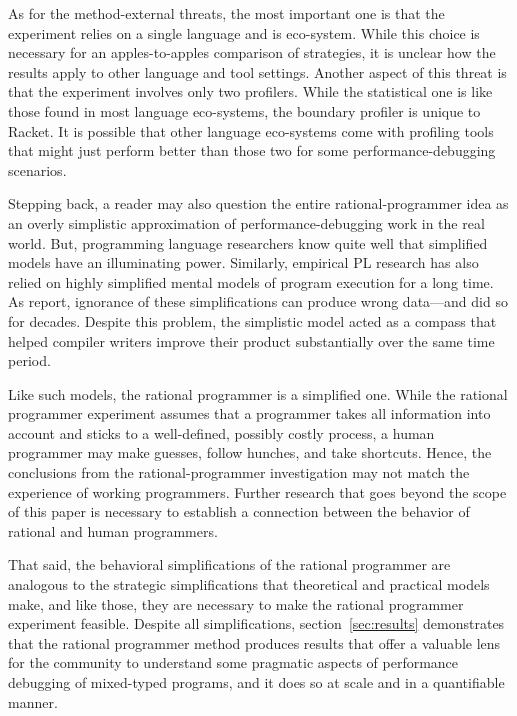 As for the method-external threats, the most important one is that the experiment
relies on a single language and is eco-system. While this choice is necessary for
an apples-to-apples comparison of strategies, it is unclear how the results apply
to other language and tool settings. Another aspect of this threat is that the
experiment involves only two profilers. While the statistical one is like those
found in most language eco-systems, the boundary profiler is unique to Racket. It
is possible that other language eco-systems come with profiling tools that might
just perform better than those two for some performance-debugging scenarios.

Stepping back, a reader may also question the entire rational-programmer idea as
an overly simplistic approximation of performance-debugging work in the real
world. But, programming language researchers know quite well that simplified
models have an illuminating power.  Similarly, empirical PL research has also
relied on highly simplified mental models of program execution for a long
time. As \citet{mdhs:wrong-data} report, ignorance of these simplifications can
produce wrong data---and did so for decades. Despite this problem, the simplistic
model acted as a compass that helped compiler writers improve their product
substantially over the same time period.

Like such models, the rational programmer is a simplified one.  While the
rational programmer experiment assumes that a programmer takes all
information into account and sticks to a well-defined, possibly costly
process, a human programmer may make guesses, follow hunches, and take
shortcuts. Hence, the conclusions from the rational-programmer
investigation may not match the experience of working programmers. Further
research that goes beyond the scope of this paper is necessary to
establish a connection between the behavior of rational and human
programmers.  

That said, the behavioral simplifications of the rational programmer are
analogous to the strategic simplifications that theoretical and practical models
make, and like those, they are necessary to make the rational programmer
experiment feasible. Despite all simplifications, section~\ref{sec:results}
demonstrates that the rational programmer method produces results that offer a
valuable lens for the community to understand some pragmatic aspects of
performance debugging of mixed-typed programs, and it does so at scale and in a
quantifiable manner.
